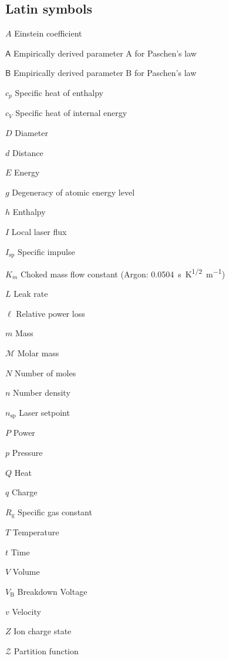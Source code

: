 \begin{multicols}{2}
    \section*{Latin symbols}
    \begin{nomlist}
        \item[$A$]              Einstein coefficient %
        \item[$\mathsf{A}$]     Empirically derived parameter A for Paschen's law 
        \item[$\mathsf{B}$]     Empirically derived parameter B for Paschen's law 
        \item[$c_p$]            Specific heat of enthalpy
        \item[$c_V$]            Specific heat of internal energy
        \item[$D$]              Diameter
        \item[$d$]              Distance
        \item[$E$]              Energy
        \item[$g$]              Degeneracy of atomic energy level
        \item[$h$]              Enthalpy
        \item[$I$]              Local laser flux %
        \item[$I_\text{sp}$]    Specific impulse %
        \item[$K_{\dot{m}}$]    Choked mass flow constant (Argon: \qty{0.0504}{s.K^{1/2}.m^{-1}}) 
        \item[$L$]              Leak rate
        \item[$\ell$]           Relative power loss
        \item[$m$]              Mass
        \item[$\mathcal{M}$]    Molar mass
        \item[$N$]              Number of moles 
        \item[$n$]              Number density 
        \item[$n_\mathrm{sp}$]  Laser setpoint 
        \item[$P$]              Power 
        \item[$p$]              Pressure
        \item[$Q$]              Heat
        \item[$q$]              Charge
        \item[$R_\mathrm{g}$]   Specific gas constant
        \item[$T$]              Temperature
        \item[$t$]              Time
        \item[$V$]              Volume
        \item[$V_\mathrm{B}$]   Breakdown Voltage
        \item[$v$]              Velocity
        \item[$Z$]              Ion charge state
        \item[$\mathcal{Z}$]    Partition function
    \end{nomlist}


\end{multicols}
